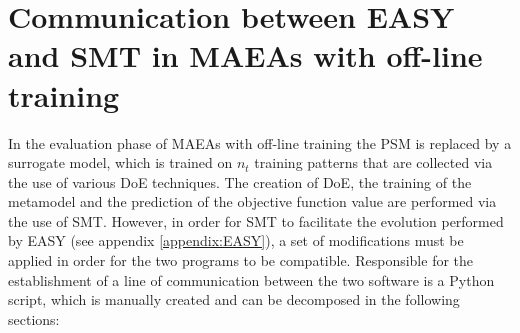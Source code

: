 \newpage


\section{Communication between EASY and SMT in MAEAs with off-line training}


In the evaluation phase of MAEAs with off-line training the PSM is 
replaced by a surrogate model, which is trained on $n_{t}$ 
training patterns that are collected via the use of various DoE 
techniques. The creation of DoE, the training of the metamodel 
and the prediction of the objective function value are performed 
via the use of SMT. However, in order for SMT to facilitate the 
evolution performed by EASY (see appendix \ref{appendix:EASY}), a 
set of modifications must be applied in order for the two programs 
to be compatible. Responsible for the establishment of a line of 
communication between the two software is a Python script, which is 
manually created and can be decomposed in the following sections:

